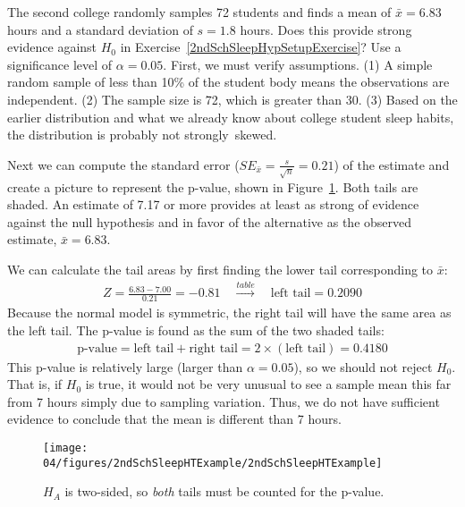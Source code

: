 \begin{example}{The second college randomly samples 72 students and finds a mean of $\bar{x} = 6.83$ hours and a standard deviation of $s=1.8$ hours. Does this provide strong evidence against $H_0$ in Exercise~\ref{2ndSchSleepHypSetupExercise}? Use a significance level of $\alpha=0.05$.}
First, we must verify assumptions. (1) A simple random sample of less than 10\% of the student body means the observations are independent. (2) The sample size is 72, which is greater than 30. (3) Based on the earlier distribution and what we already know about college student sleep habits, the distribution is probably not strongly~skewed.

Next we can compute the standard error ($SE_{\bar{x}} = \frac{s}{\sqrt{n}} = 0.21$) of the estimate and create a picture to represent the p-value, shown in Figure~\ref{2ndSchSleepHTExample}. Both tails are shaded. An estimate of 7.17 or more provides at least as strong of evidence against the null hypothesis and in favor of the alternative as the observed estimate, $\bar{x} = 6.83$.

We can calculate the tail areas by first finding the lower tail corresponding to $\bar{x}$:
\begin{eqnarray*}
Z = \frac{6.83 - 7.00}{0.21} = -0.81 \quad\stackrel{table}{\rightarrow}\quad \text{left tail}=0.2090
\end{eqnarray*}
Because the normal model is symmetric, the right tail will have the same area as the left tail. The p-value is found as the sum of the two shaded tails:
\begin{eqnarray*}
\text{p-value} = \text{left tail} + \text{right tail} = 2\times(\text{left tail}) = 0.4180
\end{eqnarray*}
This p-value is relatively large (larger than $\alpha=0.05$), so we should not reject $H_0$. That is, if $H_0$ is true, it would not be very unusual to see a sample mean this far from 7 hours simply due to sampling variation. Thus, we do not have sufficient evidence to conclude that the mean is different than 7 hours.


\begin{figure}
   \centering
   \texttt{[image: 04/figures/2ndSchSleepHTExample/2ndSchSleepHTExample]}
   \caption{$H_A$ is two-sided, so \emph{both} tails must be counted for the p-value.}
   \label{2ndSchSleepHTExample}
\end{figure}

\end{example}

